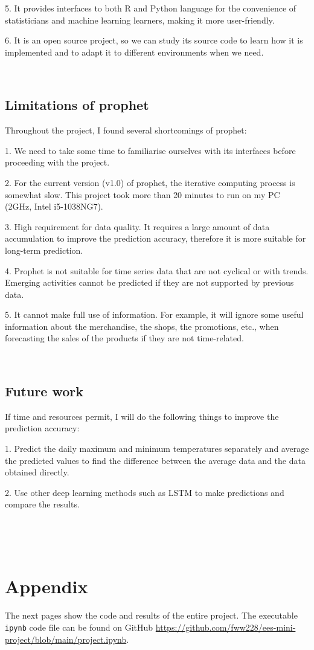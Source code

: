 \documentclass{article}
\begin{document}
5. It provides interfaces to both R and Python language for the convenience of statisticians and machine learning learners, making it more user-friendly.

6. It is an open source project, so we can study its source code to learn how it is implemented and to adapt it to different environments when we need.

\ 

\subsection{Limitations of prophet}

Throughout the project, I found several shortcomings of prophet:

1. We need to take some time to familiarise ourselves with its interfaces before proceeding with the project.

2. For the current version (v1.0) of prophet, the iterative computing process is somewhat slow. This project took more than 20 minutes to run on my PC (2GHz, Intel i5-1038NG7).

3. High requirement for data quality. It requires a large amount of data accumulation to improve the prediction accuracy, therefore it is more suitable for long-term prediction.

4. Prophet is not suitable for time series data that are not cyclical or with trends. Emerging activities cannot be predicted if they are not supported by previous data.

5. It cannot make full use of information. For example, it will ignore some useful information about the merchandise, the shops, the promotions, etc., when forecasting the sales of the products if they are not time-related.

\ 

\subsection{Future work}

If time and resources permit, I will do the following things to improve the prediction accuracy:

1. Predict the daily maximum and minimum temperatures separately and average the predicted values to find the difference between the average data and the data obtained directly.

2. Use other deep learning methods such as LSTM to make predictions and compare the results.

\ 

\ 


\section{Appendix}

The next pages show the code and results of the entire project. The executable \verb|ipynb| code file can be found on GitHub \href{https://github.com/fww228/ees-mini-project/blob/main/project.ipynb}{https://github.com/fww228/ees-mini-project/blob/main/project.ipynb}.
\end{document}
